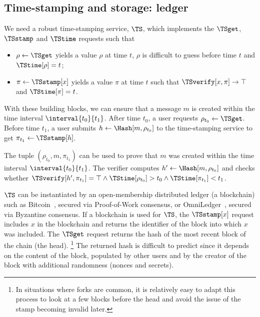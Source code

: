 \subsection{Time-stamping and storage: ledger}%
\label{StorageProperties}\label{timestamp}\label{ledger}

We need a robust time-stamping service, \(\TS\), which implements the \(\TSget\), \(\TSstamp\) and \(\TStime\) requests such that
\begin{itemize}
  \item \(\rho \gets \TSget\) yields a value \(\rho\) at time \(t\), \(\rho\) is difficult to guess before time \(t\) and \(\TStime[\rho] = t\);
  \item \(\pi\gets \TSstamp[x]\) yields a value \(\pi\) at time \(t\) such that \(\TSverify[x, \pi]\to \top\) and \(\TStime[\pi] = t\).
\end{itemize}

With these building blocks, we can ensure that a message \(m\) is created within the time interval \(\interval{t_0}{t_1}\).
After time \(t_0\), a user requests \(\rho_{t_0}\gets \TSget\).
Before time \(t_1\), a user submits \(h\gets \Hash[m, \rho_{t_0}]\) to the time-stamping service to get \(\pi_{t_1}\gets \TSstamp[h]\).

The tuple \((\rho_{t_0}, m, \pi_{t_1})\) can be used to prove that \(m\) was created within the time interval \(\interval{t_0}{t_1}\).
The verifier computes \(h'\gets \Hash[m, \rho_{t_0}]\) and checks whether \(\TSverify[h', \pi_{t_1}] = \top \land \TStime[\rho_{t_0}] > t_0\land 
  \TStime[\pi_{t_1}] < t_1\).

\(\TS\) can be instantiated by an open-membership distributed ledger (\eg a blockchain) such as Bitcoin~\cite{Bitcoin}, secured via Proof-of-Work consensus, or OmniLedger~\cite{OmniLedger}, secured via Byzantine consensus.
If a blockchain is used for \(\TS\), the \(\TSstamp[x]\) request includes \(x\) in the blockchain and returns the identifier of the block into which \(x\) was included.
The \(\TSget\) request returns the hash of the most recent block of the chain (\ie the head).
\footnote{In situations where forks are common, it is relatively easy to adapt this process to look at a few blocks before the head and avoid the issue of the stamp becoming invalid later.}
The returned hash is difficult to predict since it depends on the content of the block, populated by other users and by the creator of the block with additional randomness (\eg nonces and secrets).

